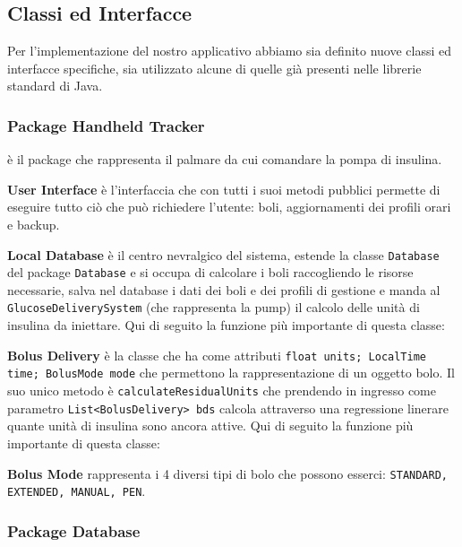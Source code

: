 \documentclass[twocolumn]{article}
\begin{document}
\subsection{Classi ed Interfacce}

Per l’implementazione del nostro applicativo abbiamo sia definito nuove classi ed interfacce specifiche, sia utilizzato alcune di quelle già presenti nelle librerie standard di Java.

\subsubsection{Package Handheld Tracker}
è il package che rappresenta il palmare da cui comandare la pompa di insulina.

\noindent\textbf{User Interface}
\newline è l'interfaccia che con tutti i suoi metodi pubblici permette di eseguire tutto ciò che può richiedere l'utente: boli, aggiornamenti dei profili orari e backup.    


\noindent\textbf{Local Database}
\newline è il centro nevralgico del sistema, estende la classe \texttt{Database} del package \texttt{Database} e si occupa di calcolare i boli raccogliendo le risorse necessarie, salva nel database i dati dei boli e dei profili di gestione e manda al \texttt{GlucoseDeliverySystem} (che rappresenta la pump) il calcolo delle unità di insulina da iniettare. Qui di seguito la funzione più importante di questa classe:



\noindent\textbf{Bolus Delivery}
\newline è la classe che ha come attributi \texttt{float units; LocalTime time; BolusMode mode} che permettono la rappresentazione di un oggetto bolo. Il suo unico metodo è \texttt{calculateResidualUnits} che prendendo in ingresso come parametro \texttt{List<BolusDelivery> bds} calcola attraverso una regressione linerare quante unità di insulina sono ancora attive. Qui di seguito la funzione più importante di questa classe:




\noindent\textbf{Bolus Mode}
\newline rappresenta i 4 diversi tipi di bolo che possono esserci: \texttt{STANDARD, EXTENDED, MANUAL, PEN}.


\subsubsection{Package Database}
\end{document}
